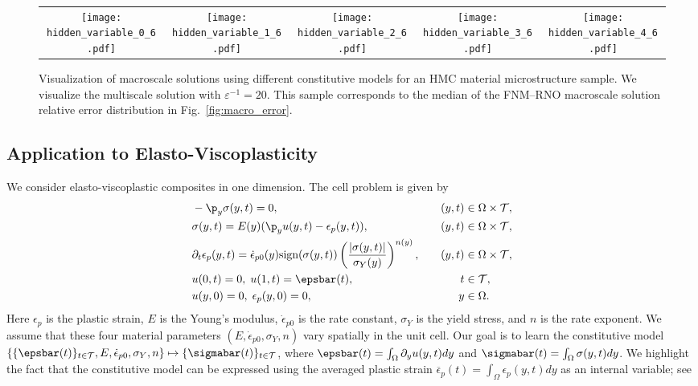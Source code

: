 \documentclass[letterpaper,11pt]{article}
\begin{document}
\begin{figure}[htbp]
{\begin{tabular}{c c c c c}
\texttt{[image: hidden\_variable\_0\_6.pdf]} &        \texttt{[image: hidden\_variable\_1\_6.pdf]} &        \texttt{[image: hidden\_variable\_2\_6.pdf]} &       \texttt{[image: hidden\_variable\_3\_6.pdf]} &    \texttt{[image: hidden\_variable\_4\_6.pdf]}
        \end{tabular}\addtolength{\tabcolsep}{6pt}}
        \caption{Visualization of macroscale solutions using different constitutive models for an HMC material microstructure sample. We visualize the multiscale solution with $\varepsilon^{-1}=20$. This sample corresponds to the median of the FNM--RNO macroscale solution relative error distribution in Fig.~\ref{fig:macro_error}.}
        \label{fig:macro_solution_sample}
    \end{figure}

\subsection{Application to Elasto-Viscoplasticity}\label{subsec:plastic}

We consider elasto-viscoplastic composites in one dimension. The cell problem is given by
\begin{subequations}\label{eq:evp_cell_problem}
    \begin{align}
        &-\p_y\sigma(y, t) = 0, &\quad (y,t) &\in \Omega \times \mathcal{T}, \\
         &\sigma(y, t) = E(y)(\p_y u(y, t) - \epsilon_p(y,t)), &\quad (y,t) &\in \Omega \times \mathcal{T}, \\
        &\partial_t \epsilon_p(y, t) = \dot{\epsilon}_{p0}(y)\text{sign}(\sigma(y,t))\left(\frac{|\sigma(y,t)|}{\sigma_Y(y)}\right)^{n(y)}, &\quad (y,t) &\in \Omega \times \mathcal{T}, \\
        &u(0, t) = 0, \; u(1, t) = \epsbar(t), &\; t &\in \mathcal{T}, \\
        &u(y, 0) = 0,\; \epsilon_p(y, 0) = 0, &\; y&\in \Omega.
    \end{align}
\end{subequations}
Here $\epsilon_p$ is the plastic strain, $E$ is the Young's modulus, $\dot{\epsilon}_{p0}$ is the rate constant, $\sigma_Y$ is the yield stress, and $n$ is the rate exponent. We assume that these four material parameters $(E,\dot{\epsilon}_{p0},\sigma_Y,n)$ vary spatially in the unit cell. Our goal is to learn the constitutive model $\{\{\epsbar(t)\}_{t\in\mathcal{T}}, E, \dot{\epsilon}_{p0}, \sigma_Y,n\}\mapsto\{\sigmabar(t)\}_{t\in\mathcal{T}}$, where $\epsbar(t)=\int_{\Omega}\partial_y u(y,t) dy$ and $\sigmabar(t)=\int_{\Omega}\sigma(y,t) dy$. We highlight the fact that the constitutive model can be expressed using the averaged plastic strain $\overline{\epsilon}_p(t) = \int_{\Omega}\epsilon_p(y, t) dy$ as an internal variable; see~\cite[Eq. 11]{liu2023learning}
\end{document}
